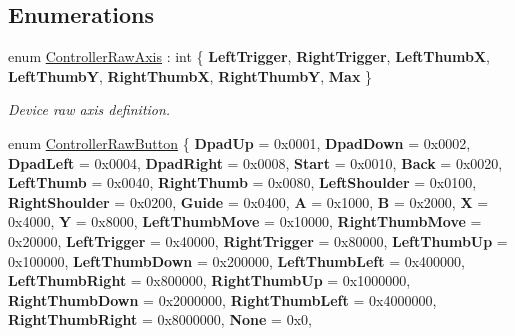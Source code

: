 \subsection*{Enumerations}
\begin{DoxyCompactItemize}
\item 
enum \mbox{\hyperlink{namespace_ximmerse_1_1_input_system_a0c8e8c63a915b6a1d6f88ef3c88223a4}{Controller\+Raw\+Axis}} \+: int \{ \newline
{\bfseries Left\+Trigger}, 
{\bfseries Right\+Trigger}, 
{\bfseries Left\+ThumbX}, 
{\bfseries Left\+ThumbY}, 
\newline
{\bfseries Right\+ThumbX}, 
{\bfseries Right\+ThumbY}, 
{\bfseries Max}
 \}
\begin{DoxyCompactList}\small\item\em Device raw axis definition. \end{DoxyCompactList}\item 
\mbox{\label{namespace_ximmerse_1_1_input_system_a33519dcdafe0e14b92c47f5bbc89dfe4}} 
enum \mbox{\hyperlink{namespace_ximmerse_1_1_input_system_a33519dcdafe0e14b92c47f5bbc89dfe4}{Controller\+Raw\+Button}} \{ \newline
{\bfseries Dpad\+Up} = 0x0001, 
{\bfseries Dpad\+Down} = 0x0002, 
{\bfseries Dpad\+Left} = 0x0004, 
{\bfseries Dpad\+Right} = 0x0008, 
\newline
{\bfseries Start} = 0x0010, 
{\bfseries Back} = 0x0020, 
{\bfseries Left\+Thumb} = 0x0040, 
{\bfseries Right\+Thumb} = 0x0080, 
\newline
{\bfseries Left\+Shoulder} = 0x0100, 
{\bfseries Right\+Shoulder} = 0x0200, 
{\bfseries Guide} = 0x0400, 
{\bfseries A} = 0x1000, 
\newline
{\bfseries B} = 0x2000, 
{\bfseries X} = 0x4000, 
{\bfseries Y} = 0x8000, 
{\bfseries Left\+Thumb\+Move} = 0x10000, 
\newline
{\bfseries Right\+Thumb\+Move} = 0x20000, 
{\bfseries Left\+Trigger} = 0x40000, 
{\bfseries Right\+Trigger} = 0x80000, 
{\bfseries Left\+Thumb\+Up} = 0x100000, 
\newline
{\bfseries Left\+Thumb\+Down} = 0x200000, 
{\bfseries Left\+Thumb\+Left} = 0x400000, 
{\bfseries Left\+Thumb\+Right} = 0x800000, 
{\bfseries Right\+Thumb\+Up} = 0x1000000, 
\newline
{\bfseries Right\+Thumb\+Down} = 0x2000000, 
{\bfseries Right\+Thumb\+Left} = 0x4000000, 
{\bfseries Right\+Thumb\+Right} = 0x8000000, 
{\bfseries None} = 0x0, 

\end{DoxyCompactItemize}
